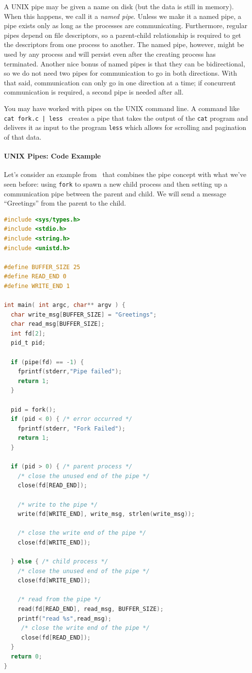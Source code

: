 A UNIX pipe may be given a name on disk (but the data is still in memory). When this happens, we call it a \textit{named pipe}. Unless we make it a named pipe, a pipe exists only as long as the processes are communicating. Furthermore, regular pipes depend on file descriptors, so a parent-child relationship is required to get the descriptors from one process to another. The named pipe, however, might be used by any process and will persist even after the creating process has terminated. Another nice bonus of named pipes is that they can be bidirectional, so we do not need two pipes for communication to go in both directions. With that said, communication can only go in one direction at a time; if concurrent communication is required, a second pipe is needed after all.

You may have worked with pipes on the UNIX command line. A command like \texttt{ cat fork.c | less } creates a pipe that takes the output of the \texttt{cat} program and delivers it as input to the program \texttt{less} which allows for scrolling and pagination of that data.

\paragraph{UNIX Pipes: Code Example}

Let's consider an example from~\cite{osc} that combines the pipe concept with what we've seen before: using \texttt{fork} to spawn a new child process and then setting up a communication pipe between the parent and child. We will send a message ``Greetings'' from the parent to the child.

\begin{lstlisting}[language=C]
#include <sys/types.h> 
#include <stdio.h> 
#include <string.h> 
#include <unistd.h>

#define BUFFER_SIZE 25
#define READ_END 0 
#define WRITE_END 1

int main( int argc, char** argv ) {
  char write_msg[BUFFER_SIZE] = "Greetings"; 
  char read_msg[BUFFER_SIZE];
  int fd[2];
  pid_t pid;

  if (pipe(fd) == -1) {
    fprintf(stderr,"Pipe failed");
    return 1;
  }
  
  pid = fork();
  if (pid < 0) { /* error occurred */ 
    fprintf(stderr, "Fork Failed"); 
    return 1;
  }

  if (pid > 0) { /* parent process */
    /* close the unused end of the pipe */ 
    close(fd[READ_END]);
    
    /* write to the pipe */
    write(fd[WRITE_END], write_msg, strlen(write_msg));
    
    /* close the write end of the pipe */
    close(fd[WRITE_END]);
    
  } else { /* child process */
    /* close the unused end of the pipe */ 
    close(fd[WRITE_END]);
    
    /* read from the pipe */
    read(fd[READ_END], read_msg, BUFFER_SIZE); 
    printf("read %s",read_msg);
     /* close the write end of the pipe */
     close(fd[READ_END]);
  }
  return 0;
}
\end{lstlisting}

